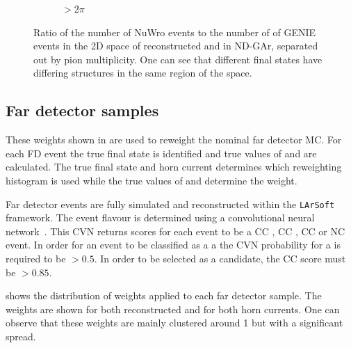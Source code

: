 \begin{figure}[t]
\begin{subfigure}[t]{.5\linewidth}
		\begin{adjustbox}{max totalsize=\linewidth, center}
			
		\end{adjustbox}
		\caption{$>2\pi$}
	\end{subfigure}
	\caption[Ratio of NuWro to GENIE of two-dimensional distributions of \evis and \pvis in ND-GAr.]{Ratio of the number of NuWro events to the number of of GENIE events in the 2D space of reconstructed \evis and \pvis in ND-GAr, separated out by pion multiplicity. One can see that different final states have differing structures in the same region of the space.}
	\label{fig:q0q3RatioFhc}
\end{figure}

\subsection{Far detector samples}
\label{sec:dune_ndrwt:rwt:fd}

These weights shown in  are used to reweight the nominal far detector MC.
For each FD event the true final state is identified and true values of \evis and \pvis are calculated.
The true final state and horn current determines which reweighting histogram is used while the true values of \evis and \pvis determine the weight.

Far detector events are fully simulated and reconstructed within the \texttt{LArSoft}~\cite{larsoft} framework.
The event flavour is determined using a convolutional neural network~\cite{duneCVN}.
This CVN returns scores for each event to be a CC \numu, CC \nue, CC \nutau or NC event.
In order for an event to be classified as a \numu a the CVN probability for a \numu is required to be $>0.5$. 
In order to be selected as a \nue candidate, the CC \nue score must be $>0.85$. 

 shows the distribution of weights applied to each far detector sample.
The weights are shown for both reconstructed \numu and \nue for both horn currents.
One can observe that these weights are mainly clustered around 1 but with a significant spread.

